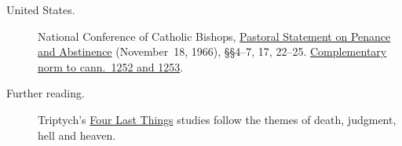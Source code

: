 \begin{description}
\item[United States.] National Conference of Catholic Bishops,
  \href{https://www.usccb.org/prayer-and-worship/liturgical-year-and-calendar/lent/us-bishops-pastoral-statement-on-penance-and-abstinence}{Pastoral Statement on Penance and Abstinence}
  (November~18, 1966), \S\S4--7, 17, 22--25.
  \href{https://www.usccb.org/beliefs-and-teachings/what-we-believe/canon-law/complementary-norms/canons-1252-and-1253-observance-of-fast-and-abstinence}{Complementary norm to cann.~1252 and 1253}.

\item[Further reading.] Triptych's
  \href{https://mystago.gy/library/faith.html\#the-four-last-things}{Four Last Things}
  studies follow the themes of death, judgment, hell and heaven.
\end{description}
